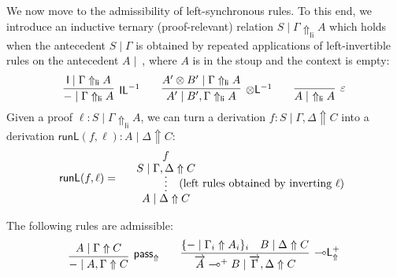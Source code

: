 \documentclass[runningheads]{llncs}
\renewcommand{\vec}{\overrightarrow}
\newcommand{\tl}{\otimes \mathsf{L}}
\newcommand{\lleft}{{\multimap}\mathsf{L}}
\newcommand{\pass}{\mathsf{pass}}
\newcommand{\unitl}{\mathsf{IL}}
\newcommand{\otL}{\tl}
\newcommand{\lolliL}{\lleft}
\newcommand{\IL}{\unitl}
\newcommand{\ot}{\otimes}
\newcommand{\lolli}{\multimap}
\newcommand{\I}{\mathsf{I}}
\renewcommand{\L}{\mathsf{L}}
\newcommand{\proofbox}[1]{\begin{tabular}{l} #1 \end{tabular}}
\newcommand{\up}{\Uparrow}
\newcommand{\upl}{\Uparrow_{\mathsf{li}}}
\newcommand{\runL}{\mathsf{runL}}
\begin{document}
We now move to the admissibility of left-synchronous rules. To this end, we introduce an inductive ternary (proof-relevant) relation $S\mid\Gamma \upl A$ which holds when the antecedent $S\mid \Gamma$ is obtained by repeated applications of left-invertible rules on the antecedent $A \mid ~$, where $A$ is in the stoup and the context is empty:
\begin{equation*}%
  \infer[\IL^{-1}]{-\mid\Gamma \upl A}{\I\mid\Gamma\upl A}
  \qquad
  \infer[\otL^{-1}]{A'\mid B',\Gamma \upl A}{A' \ot B'\mid \Gamma \upl A}
  \qquad
  \infer[\varepsilon]{A\mid ~ \upl A}{}
\end{equation*}
Given a proof $\ell : S\mid\Gamma \upl A$, we can turn a derivation $f : S \mid \Gamma,\Delta \up C$ into a derivation $\runL(f,\ell) : A \mid \Delta \up C$:
 \begin{equation}\label{eq:runL}
  \runL(f,\ell) = \quad
  \proofbox{
    \infer*[\;\; (\text{left rules obtained by inverting } \ell)]{A \mid \Delta \up C}{
      \deduce{S \mid \Gamma,\Delta \up C}{f}
    }
    }
 \end{equation}
\begin{proposition}\label{prop:lolliL}
  The following rules are admissible:
  \begin{equation*}\label{eq:passlolliL}
  \begin{array}{c}
    \infer[\pass_\up]{- \mid A,\Gamma \up C}{
      A \mid \Gamma \up C}
    \qquad
    \infer[\lolliL^+_\up]{\vec{A} \lolli^+ B \mid \vec{\Gamma} , \Delta \up C}{
      \{ - \mid \Gamma_i \up A_i \}_{i}
      &
      B \mid \Delta \up C
    }
  \end{array}
  \end{equation*}
\end{proposition}
\end{document}
